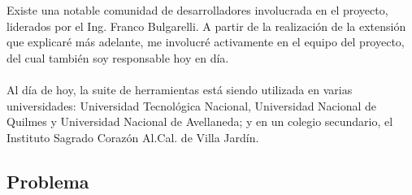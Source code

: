 Existe una notable comunidad de desarrolladores involucrada en el proyecto, liderados por el Ing. Franco Bulgarelli. A partir de la realización de la extensión que explicaré más adelante, me involucré activamente en el equipo del proyecto, del cual también soy responsable hoy en día.
\\\\
Al día de hoy, la suite de herramientas está siendo utilizada en varias universidades: Universidad Tecnológica Nacional, Universidad Nacional de Quilmes y Universidad Nacional de Avellaneda; y en un colegio secundario, el Instituto Sagrado Corazón Al.Cal. de Villa Jardín.

\subsection{Problema}
